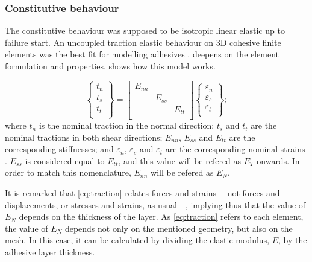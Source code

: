 \documentclass[cmfonts]{witpress}
\begin{document}
\subsubsection{Constitutive behaviour}
\label{sec:elastic}

The constitutive behaviour was supposed to be isotropic linear elastic \cite{SernaMoreno2015} up to failure start. An uncoupled traction elastic behaviour \cite{Sadowski2010, Sadowski2011, Scattina2011, Sadowski2014} on 3D cohesive finite elements was the best fit for modelling adhesives \cite{Abaqus613Manual}.  deepens on the element formulation and properties.  shows how this model works.

\begin{equation}
\begin{Bmatrix}
t_n \\
t_s \\
t_t \\
\end{Bmatrix}
=
\begin{bmatrix}
E_{nn} & & \\
& E_{ss} & \\
& & E_{tt} \\
\end{bmatrix}
\begin{Bmatrix}
\varepsilon_n \\
\varepsilon_s \\
\varepsilon_t \\
\end{Bmatrix} ;
\label{eq:traction}
\end{equation}
where $t_n$ is the nominal traction in the normal direction; $t_s$ and $t_t$ are the nominal tractions in both shear directions; $E_{nn}$, $E_{ss}$ and $E_{tt}$ are the corresponding stiffnesses; and $\varepsilon_n$, $\varepsilon_s$ and $\varepsilon_t$ are the corresponding nominal strains \cite{Abaqus613Manual}. $E_{ss}$ is considered equal to $E_{tt}$, and this value will be refered as $E_{T}$ onwards. In order to match this nomenclature, $E_{nn}$ will be refered as $E_{N}$.

It is remarked that \cref{eq:traction} relates forces and strains ---not forces and displacements, or stresses and strains, as usual---, implying thus that the value of $E_{N}$ depends on the thickness of the layer. As \cref{eq:traction} refers to each element, the value of $E_{N}$ depends not only on the mentioned geometry, but also on the mesh. In this case, it can be calculated by dividing the elastic modulus, $E$, by the adhesive layer thickness.
\end{document}
